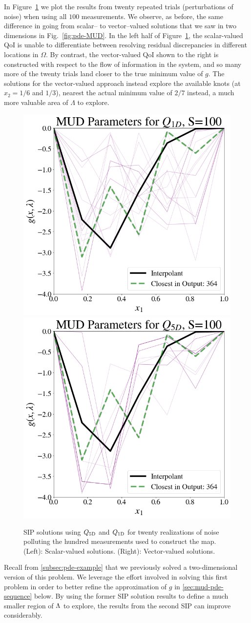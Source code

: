 In Figure~\ref{fig:pde-highd-5d-mud} we plot the results from twenty repeated trials (perturbations of noise) when using all $100$ measurements.
We observe, as before, the same difference in going from scalar-- to vector--valued solutions that we saw in two dimensions in Fig.~\ref{fig:pde-MUD}.
In the left half of Figure~\ref{fig:pde-highd-5d-mud}, the scalar-valued QoI is unable to differentiate between resolving residual discrepancies in different locations in $\Omega$.
By contrast, the vector-valued QoI shown to the right is constructed with respect to the flow of information in the system, and so many more of the twenty trials land closer to the true minimum value of $g$.
The solutions for the vector-valued approach instead explore the available knots (at $x_2=1/6$ and $1/3$), nearest the actual minimum value of $2/7$ instead, a much more valuable area of $\Lambda$ to explore.

\begin{figure}
\centering
  \includegraphics[width=0.45\linewidth]{figures/pde-highd/pde-highd_pair_D5-1_m100}
  \includegraphics[width=0.45\linewidth]{figures/pde-highd/pde-highd_pair_D5-5_m100}
\caption{ SIP solutions using $Q_\text{5D}$ and $Q_\text{1D}$ for twenty realizations of noise polluting the hundred measurements used to construct the map.
(Left): Scalar-valued solutions.
(Right): Vector-valued solutions.
}
\label{fig:pde-highd-5d-mud}
\end{figure}


Recall from \ref{subsec:pde-example} that we previously solved a two-dimensional version of this problem.
We leverage the effort involved in solving this first problem in order to better refine the approximation of $g$ in \ref{sec:mud-pde-sequence} below.
By using the former SIP solution results to define a much smaller region of ${\Lambda}$ to explore, the results from the second SIP can improve considerably.

